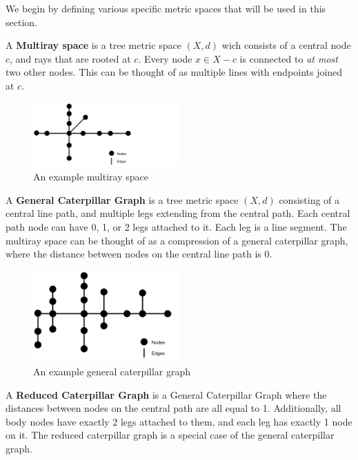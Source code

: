 We begin by defining various specific metric spaces that will be used in this section.
\begin{definition}
    A \textbf{Multiray space} is a tree metric space $(X, d)$ wich consists of a central node $c$, and rays that are rooted at $c$. Every node $x \in X - c$ is connected to \textit{at most} two other nodes. This can be thought of as multiple lines with endpoints joined at $c$.
\end{definition}

\begin{figure}[H]
    \centering
    \includegraphics[width=0.5\textwidth]{images/multiray.png}
    \caption{An example multiray space}
\end{figure}

\begin{definition}
    A \textbf{General Caterpillar Graph} is a tree metric space $(X, d)$ consisting of a central line path, and multiple legs extending from the central path. Each central path node can have 0, 1, or 2 legs attached to it. Each leg is a line segment. The multiray space can be thought of as a compression of a general caterpillar graph, where the distance between nodes on the central line path is 0.
\end{definition}

\begin{figure}[H]
    \centering
    \includegraphics[width=0.5\textwidth]{images/generalCaterpillar.png}
    \caption{An example general caterpillar graph}
\end{figure}

\begin{definition}
    A \textbf{Reduced Caterpillar Graph} is a General Caterpillar Graph where the distances between nodes on the central path are all equal to 1. Additionally, all body nodes have exactly 2 legs attached to them, and each leg has exactly 1 node on it. The reduced caterpillar graph is a special case of the general caterpillar graph.
\end{definition}

